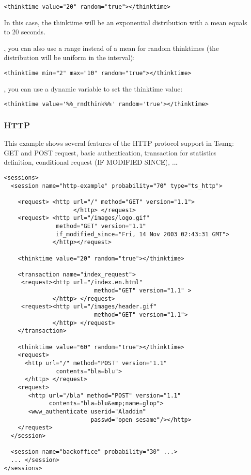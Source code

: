 \documentclass{TSUNG-en}
\begin{document}
\begin{Verbatim}
<thinktime value="20" random="true"></thinktime>
\end{Verbatim}

In this case, the thinktime will be an exponential distribution with a
mean equals to 20 seconds.

, you can also use a range
 instead of a mean for random thinktimes (the
distribution will be uniform in the interval):
\begin{Verbatim}
<thinktime min="2" max="10" random="true"></thinktime>
\end{Verbatim}

, you can use a dynamic variable to set
the thinktime value:
\begin{Verbatim}
<thinktime value='%%_rndthink%%' random='true'></thinktime>
\end{Verbatim}


\subsubsection{HTTP}


This example shows several features of the HTTP protocol support in
Tsung: GET and POST request, basic authentication, transaction for
statistics definition, conditional request (IF MODIFIED SINCE), ...


\begin{Verbatim}
<sessions>
  <session name="http-example" probability="70" type="ts_http">

    <request> <http url="/" method="GET" version="1.1">
                    </http> </request>
    <request> <http url="/images/logo.gif"
               method="GET" version="1.1"
               if_modified_since="Fri, 14 Nov 2003 02:43:31 GMT">
              </http></request>

    <thinktime value="20" random="true"></thinktime>

    <transaction name="index_request">
     <request><http url="/index.en.html"
                          method="GET" version="1.1" >
              </http> </request>
     <request><http url="/images/header.gif"
                          method="GET" version="1.1">
              </http> </request>
    </transaction>

    <thinktime value="60" random="true"></thinktime>
    <request>
      <http url="/" method="POST" version="1.1"
               contents="bla=blu">
      </http> </request>
    <request>
       <http url="/bla" method="POST" version="1.1"
             contents="bla=blu&amp;name=glop">
       <www_authenticate userid="Aladdin"
                         passwd="open sesame"/></http>
    </request>
  </session>

  <session name="backoffice" probability="30" ...>
  ... </session>
</sessions>
\end{Verbatim}
\end{document}
